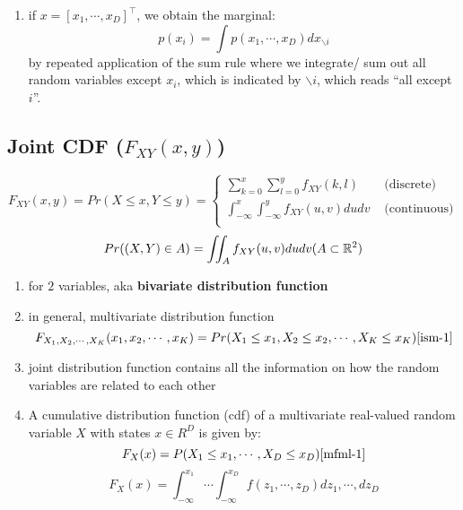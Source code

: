 \begin{enumerate}
    \item if $x = [x_1, \cdots , x_D]^\top$, we obtain the marginal:\cite{mfml-1}
    \[
        p(x_i) = \displaystyle\int
        p(x_1, \cdots , x_D)dx_{\backslash i}
    \]
    by repeated application of the sum rule where we integrate/ sum out all random variables except $x_i$, which is indicated by $\backslash i$, which reads “all except $i$”.

\end{enumerate}

\subsection{Joint CDF ($F_{XY}(x, y)$) \cite{ism-1,mfml-1}} \label{joint CDF}

\[
    F_{XY}(x, y)
    = Pr(X \leq x, Y \leq y) 
    = \begin{cases}
        \displaystyle\sum_{k=0}^{x}
        \displaystyle\sum_{l=0}^{y} f_{XY}(k,l) & \text{ (discrete)}\\[3ex]
        \displaystyle\int_{-\infty}^{x}
        \displaystyle\int_{-\infty}^{y} 
        f_{XY}(u,v)dudv & \text{ (continuous)}\\
    \end{cases}
\]
\[
    Pr((X,Y)\in A) 
    = \displaystyle\iint_A f_{XY}(u,v) dudv
    \hfill
    (A \subset \mathbb{R}^2)
\]

\begin{enumerate}
    \item for $2$ variables, aka \textbf{bivariate distribution function}

    \item in general, multivariate distribution function
    \[
        F_{X_1,X_2,\cdots,X_K}(x_1,x_2,\cdots,x_K)
        = Pr(X_1 \leq x_1, X_2 \leq x_2,\cdots,X_K \leq x_K)
        \hfill
        \text{\cite{ism-1}}
    \]

    \item joint distribution function contains all the information on how the random variables are related to each other

    \item A cumulative distribution function (cdf) of a multivariate real-valued random variable $X$ with states $x \in R^D$ is given by: \cite{mfml-1}
    \[
        F_X(x) = P(X_1 \leq x_1, \cdots , X_D \leq x_D)
        \hfill
        \text{\cite{mfml-1}}
    \]
    \[
        \displaystyle
        F_X(x) =
        \int_{-\infty}^{x_1}
        \cdots
        \int_{-\infty}^{x_D}
        f(z_1,\cdots,z_D) dz_1,\cdots,dz_D
    \]
\end{enumerate}

